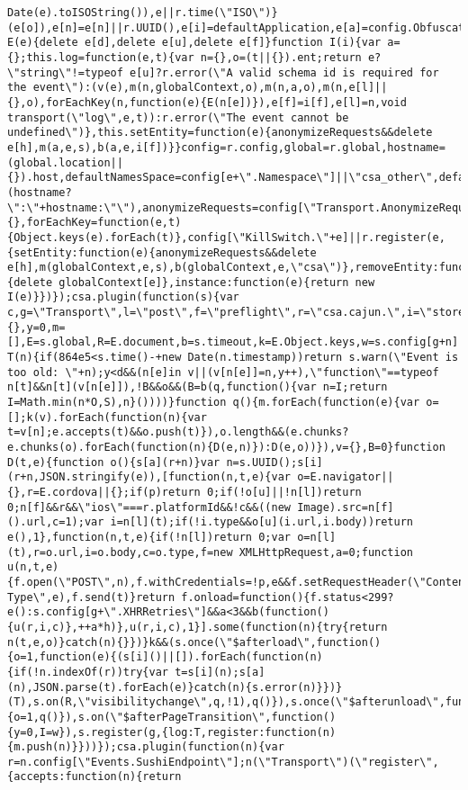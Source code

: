 \documentclass[
]{article}
\begin{document}
\begin{verbatim}
Date(e).toISOString()),e||r.time(\"ISO\")}(e[o]),e[n]=e[n]||r.UUID(),e[i]=defaultApplication,e[a]=config.ObfuscatedMarketplaceId||t,e[u]=e[u].replace(g,defaultNamesSpace)}function E(e){delete e[d],delete e[u],delete e[f]}function I(i){var a={};this.log=function(e,t){var n={},o=(t||{}).ent;return e?\"string\"!=typeof e[u]?r.error(\"A valid schema id is required for the event\"):(v(e),m(n,globalContext,o),m(n,a,o),m(n,e[l]||{},o),forEachKey(n,function(e){E(n[e])}),e[f]=i[f],e[l]=n,void transport(\"log\",e,t)):r.error(\"The event cannot be undefined\")},this.setEntity=function(e){anonymizeRequests&&delete e[h],m(a,e,s),b(a,e,i[f])}}config=r.config,global=r.global,hostname=(global.location||{}).host,defaultNamesSpace=config[e+\".Namespace\"]||\"csa_other\",defaultApplication=config.Application||\"Other\"+(hostname?\":\"+hostname:\"\"),anonymizeRequests=config[\"Transport.AnonymizeRequests\"]||!1,transport=r(\"Transport\"),globalContext={},forEachKey=function(e,t){Object.keys(e).forEach(t)},config[\"KillSwitch.\"+e]||r.register(e,{setEntity:function(e){anonymizeRequests&&delete e[h],m(globalContext,e,s),b(globalContext,e,\"csa\")},removeEntity:function(e){delete globalContext[e]},instance:function(e){return new I(e)}})});csa.plugin(function(s){var c,g=\"Transport\",l=\"post\",f=\"preflight\",r=\"csa.cajun.\",i=\"store\",a=\"deleteStored\",u=\"sendBeacon\",t=\"__merge\",e=\"messageId\",n=\".FlushInterval\",o=0,d=s.config[g+\".BufferSize\"]||2e3,h=s.config[g+\".RetryDelay\"]||1500,p=s.config[g+\".AnonymizeRequests\"]||!1,v={},y=0,m=[],E=s.global,R=E.document,b=s.timeout,k=E.Object.keys,w=s.config[g+n]||5e3,I=w,O=s.config[g+n+\".BackoffFactor\"]||1,S=s.config[g+n+\".BackoffLimit\"]||3e4,B=0;function T(n){if(864e5<s.time()-+new Date(n.timestamp))return s.warn(\"Event is too old: \"+n);y<d&&(n[e]in v||(v[n[e]]=n,y++),\"function\"==typeof n[t]&&n[t](v[n[e]]),!B&&o&&(B=b(q,function(){var n=I;return I=Math.min(n*O,S),n}())))}function q(){m.forEach(function(e){var o=[];k(v).forEach(function(n){var t=v[n];e.accepts(t)&&o.push(t)}),o.length&&(e.chunks?e.chunks(o).forEach(function(n){D(e,n)}):D(e,o))}),v={},B=0}function D(t,e){function o(){s[a](r+n)}var n=s.UUID();s[i](r+n,JSON.stringify(e)),[function(n,t,e){var o=E.navigator||{},r=E.cordova||{};if(p)return 0;if(!o[u]||!n[l])return 0;n[f]&&r&&\"ios\"===r.platformId&&!c&&((new Image).src=n[f]().url,c=1);var i=n[l](t);if(!i.type&&o[u](i.url,i.body))return e(),1},function(n,t,e){if(!n[l])return 0;var o=n[l](t),r=o.url,i=o.body,c=o.type,f=new XMLHttpRequest,a=0;function u(n,t,e){f.open(\"POST\",n),f.withCredentials=!p,e&&f.setRequestHeader(\"Content-Type\",e),f.send(t)}return f.onload=function(){f.status<299?e():s.config[g+\".XHRRetries\"]&&a<3&&b(function(){u(r,i,c)},++a*h)},u(r,i,c),1}].some(function(n){try{return n(t,e,o)}catch(n){}})}k&&(s.once(\"$afterload\",function(){o=1,function(e){(s[i]()||[]).forEach(function(n){if(!n.indexOf(r))try{var t=s[i](n);s[a](n),JSON.parse(t).forEach(e)}catch(n){s.error(n)}})}(T),s.on(R,\"visibilitychange\",q,!1),q()}),s.once(\"$afterunload\",function(){o=1,q()}),s.on(\"$afterPageTransition\",function(){y=0,I=w}),s.register(g,{log:T,register:function(n){m.push(n)}}))});csa.plugin(function(n){var r=n.config[\"Events.SushiEndpoint\"];n(\"Transport\")(\"register\",{accepts:function(n){return 
\end{verbatim}
\end{document}
